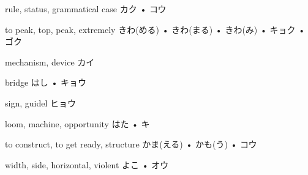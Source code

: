 



\setcounter{cardnum}{57}

		{rule, status, grammatical case}
		{カク • コウ}
		{}{}
		{}{}
		{}{}
		{}{}
		{}{}

		{to peak, top, peak, extremely}
		{きわ(める) • きわ(まる) • きわ(み) • キョク • ゴク}
		{}{}
		{}{}
		{}{}
		{}{}
		{}{}

		{mechanism, device}
		{カイ}
		{}{}
		{}{}
		{}{}
		{}{}
		{}{}

		{bridge}
		{はし • キョウ}
		{}{}
		{}{}
		{}{}
		{}{}
		{}{}

		{sign, guidel}
		{ヒョウ}
		{}{}
		{}{}
		{}{}
		{}{}
		{}{}

		{loom, machine, opportunity}
		{はた • キ}
		{}{}
		{}{}
		{}{}
		{}{}
		{}{}

		{to construct, to get ready, structure}
		{かま(える) • かも(う) • コウ}
		{}{}
		{}{}
		{}{}
		{}{}
		{}{}

		{width, side, horizontal, violent}
		{よこ • オウ}
		{}{}
		{}{}
		{}{}
		{}{}
		{}{}

